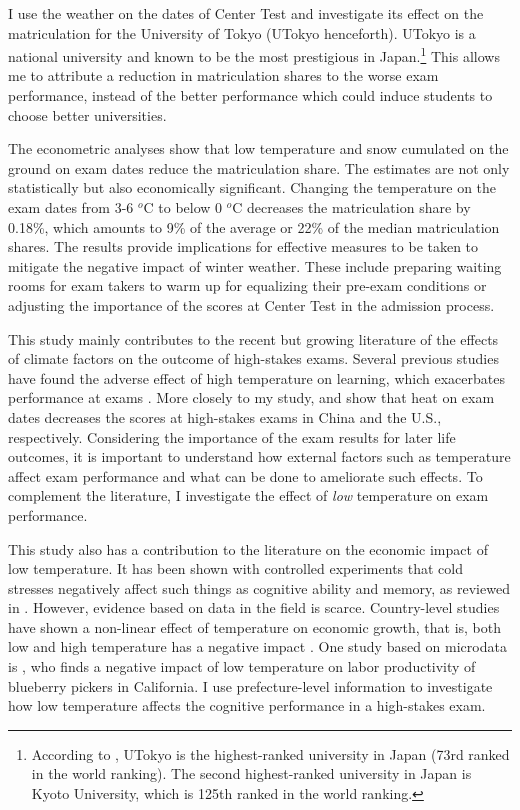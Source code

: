 \documentclass[12pt,letterpaper]{article}
\begin{document}
I use the weather on the dates of Center Test and investigate its effect on the matriculation for the University of Tokyo (UTokyo henceforth).
UTokyo is a national university and known to be the most prestigious in Japan.\footnote{
  According to \citet{usnews}, UTokyo is the highest-ranked university in Japan (73rd ranked in the world ranking).
  The second highest-ranked university in Japan is Kyoto University, which is 125th ranked in the world ranking.
}
This allows me to attribute a reduction in matriculation shares to the worse exam performance, instead of the better performance which could induce students to choose better universities.

The econometric analyses show that low temperature and snow cumulated on the ground on exam dates reduce the matriculation share.
The estimates are not only statistically but also economically significant.
Changing the temperature on the exam dates from 3-6 $^o$C to below 0 $^o$C decreases the matriculation share by 0.18\%, which amounts to 9\% of the average or 22\% of the median matriculation shares.
The results provide implications for effective measures to be taken to mitigate the negative impact of winter weather.
These include preparing waiting rooms for exam takers to warm up for equalizing their pre-exam conditions or adjusting the importance of the scores at Center Test in the admission process.

This study mainly contributes to the recent but growing literature of the effects of climate factors on the outcome of high-stakes exams.
Several previous studies have found the adverse effect of high temperature on learning, which exacerbates performance at exams \citep{Park2020b, Cho2017}.
More closely to my study, \citet{GraffZivin2020} and \citet{Park2020a} show that heat on exam dates decreases the scores at high-stakes exams in China and the U.S., respectively.
Considering the importance of the exam results for later life outcomes, it is important to understand how external factors such as temperature affect exam performance and what can be done to ameliorate such effects.
To complement the literature, I investigate the effect of \textit{low} temperature on exam performance.

This study also has a contribution to the literature on the economic impact of low temperature.
It has been shown with controlled experiments that cold stresses negatively affect such things as cognitive ability and memory, as reviewed in \citet{Taylor2016}.
However, evidence based on data in the field is scarce.
Country-level studies have shown a non-linear effect of temperature on economic growth, that is, both low and high temperature has a negative impact \citep{Burke2015}.
One study based on microdata is \citet{Stevens2017}, who finds a negative impact of low temperature on labor productivity of blueberry pickers in California.
I use prefecture-level information to investigate how low temperature affects the cognitive performance in a high-stakes exam.
\end{document}
